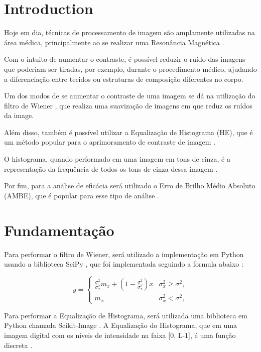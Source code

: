\documentclass[conference]{IEEEtran}
\begin{document}
\section{Introduction}

Hoje em dia, técnicas de processamento de imagem são amplamente utilizadas na área médica, principalmente ao se realizar uma Resonância Magnética \cite{b1}. 

Com o intuito de aumentar o contraste, é possível reduzir o ruído das imagens que poderiam ser tiradas, por exemplo, durante o procedimento médico, ajudando a diferenciação entre tecidos ou estruturas de composição diferentes no corpo\cite{b2}.

Um dos modos de se aumentar o contraste de uma imagem se dá na utilização do filtro de Wiener \cite{b3}, que realiza uma suavização de imagens em que reduz os ruídos da image.

Além disso, também é possível utilizar a Equalização de Histograma (HE), que é um método popular para o aprimoramento de contraste de imagem \cite{b6} \cite{b7} \cite{b8}.

O histograma, quando performado em uma imagem em tons de cinza, é a representação da frequência de todos os tons de cinza dessa imagem \cite{b9}.

Por fim, para a análise de eficácia será utilizado o Erro de Brilho Médio Absoluto (AMBE), que é popular para esse tipo de análise \cite{b11}.

\section{Fundamentação}

Para performar o filtro de Wiener, será utilizado a implementação em Python usando a biblioteca SciPy \cite{b4}, que foi implementada seguindo a formula abaixo \cite{b5}:

\begin{equation}
y=\left\{ \begin{array}{cc} \frac{\sigma^{2}}{\sigma_{x}^{2}}m_{x}+\left(1-\frac{\sigma^{2}}{\sigma_{x}^{2}}\right)x & \sigma_{x}^{2}\geq\sigma^{2},\\ m_{x} & \sigma_{x}^{2}<\sigma^{2},\end{array}\right.
\end{equation}

Para performar a Equalização de Histograma, será utilizada uma biblioteca em Python chamada Scikit-Image \cite{b10}. A Equalização do Histograma, que em uma imagem digital com os níveis de intensidade na faixa [0, L-1], é uma função discreta \cite{b8}.
\end{document}
